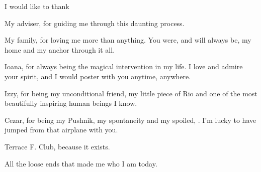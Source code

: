 I would like to thank 

My adviser, for guiding me through this daunting process. \par

My family, for loving me more than anything. You were, and will always be, my home and my anchor through it all. \par

Ioana, for always being the magical intervention in my life. I love and admire your spirit, and I would poster with you anytime, anywhere. \par

Izzy, for being my unconditional friend, my little piece of Rio and one of the most beautifully inspiring human beings I know. \par

Cezar, for being my Pushnik, my spontaneity and my spoiled, . I'm lucky to have jumped from that airplane with you. \par

Terrace F. Club, because it exists.\par

All the loose ends that made me who I am today.

